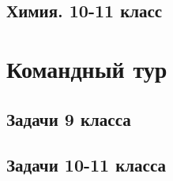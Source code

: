 \documentclass[a4paper,12pt,oneside]{book}
\begin{document}
\section{Химия. 10-11 класс}
%

\chapter{Командный тур}

\section{Задачи 9 класса} 



\section{Задачи 10-11 класса}


\end{document}
